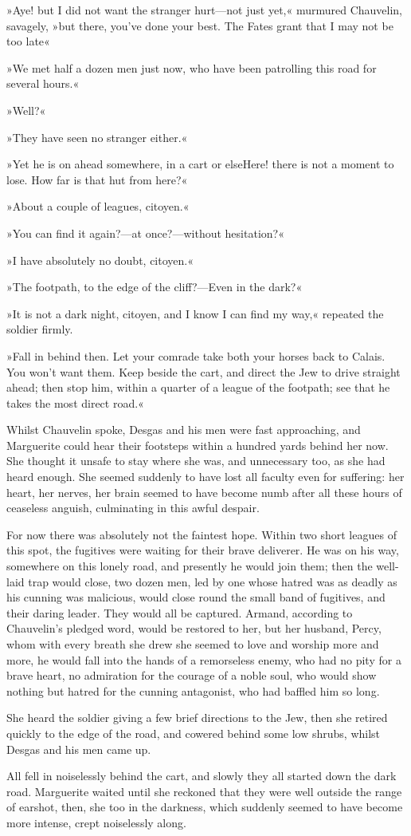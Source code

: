 »Aye! but I did not want the stranger hurt—not just yet,« murmured Chauvelin, savagely, »but there, you've done your best. The Fates grant that I may not be too late\textellipsis«

»We met half a dozen men just now, who have been patrolling this road for several hours.«

»Well?«

»They have seen no stranger either.«

»Yet he is on ahead somewhere, in a cart or else\textellipsis \allowbreak  Here! there is not a moment to lose. How far is that hut from here?«

»About a couple of leagues, citoyen.«

»You can find it again?—at once?—without hesitation?«

»I have absolutely no doubt, citoyen.«

»The footpath, to the edge of the cliff?—Even in the dark?«

»It is not a dark night, citoyen, and I know I can find my way,« repeated the soldier firmly.

»Fall in behind then. Let your comrade take both your horses back to Calais. You won't want them. Keep beside the cart, and direct the Jew to drive straight ahead; then stop him, within a quarter of a league of the footpath; see that he takes the most direct road.«

Whilst Chauvelin spoke, Desgas and his men were fast approaching, and Marguerite could hear their footsteps within a hundred yards behind her now. She thought it unsafe to stay where she was, and unnecessary too, as she had heard enough. She seemed suddenly to have lost all faculty even for suffering: her heart, her nerves, her brain seemed to have become numb after all these hours of ceaseless anguish, culminating in this awful despair.

For now there was absolutely not the faintest hope. Within two short leagues of this spot, the fugitives were waiting for their brave deliverer. He was on his way, somewhere on this lonely road, and presently he would join them; then the well-laid trap would close, two dozen men, led by one whose hatred was as deadly as his cunning was malicious, would close round the small band of fugitives, and their daring leader. They would all be captured. Armand, according to Chauvelin's pledged word, would be restored to her, but her husband, Percy, whom with every breath she drew she seemed to love and worship more and more, he would fall into the hands of a remorseless enemy, who had no pity for a brave heart, no admiration for the courage of a noble soul, who would show nothing but hatred for the cunning antagonist, who had baffled him so long.

She heard the soldier giving a few brief directions to the Jew, then she retired quickly to the edge of the road, and cowered behind some low shrubs, whilst Desgas and his men came up.

All fell in noiselessly behind the cart, and slowly they all started down the dark road. Marguerite waited until she reckoned that they were well outside the range of earshot, then, she too in the darkness, which suddenly seemed to have become more intense, crept noiselessly along.